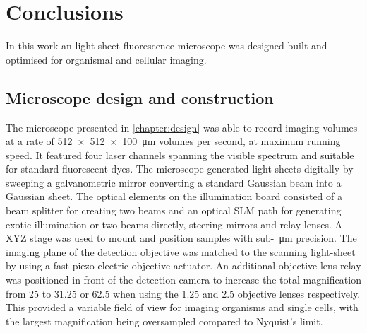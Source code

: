\ifpdf
    \graphicspath{{Chapters/conclusions/Figs/Raster/}{Chapters/conclusions/Figs/PDF/}{Chapters/conclusions/Figs/}}
\else
    \graphicspath{{Chapters/conclusions/Figs/Vector/}{Chapters/conclusions/Figs/}}
\fi

\chapter{Conclusions}\label{chapter:conclusions}

In this work an \gls{light-sheet} fluorescence microscope was designed built and optimised for organismal and cellular imaging.

\section{Microscope design and construction}

The microscope presented in \ref{chapter:design} was able to record imaging volumes at a rate of \SI{512x512x100}{\micro\meter} volumes per second, at maximum running speed.
It featured four laser channels spanning the visible spectrum and suitable for standard fluorescent dyes.
The microscope generated light-sheets digitally by sweeping a galvanometric mirror converting a standard Gaussian beam into a Gaussian sheet.
The optical elements on the \gls{illumination board} consisted of a beam splitter for creating two beams and an optical \gls{SLM} path for generating exotic illumination or two beams directly, steering mirrors and relay lenses.
A XYZ stage was used to mount and position samples with sub-\SI{}{\micro\meter} precision.
The imaging plane of the  detection objective was matched to the scanning light-sheet by using a fast piezo electric objective actuator.
An additional objective lens relay was positioned in front of the detection camera to increase the total magnification from \SI{25}{\times} to \SI{31.25}{\times} or \SI{62.5}{\times} when using the \SI{1.25}{\times} and \SI{2.5}{\times} objective lenses respectively.
This provided a variable field of view for imaging organisms and single cells, with the largest magnification being oversampled compared to Nyquist's limit.

